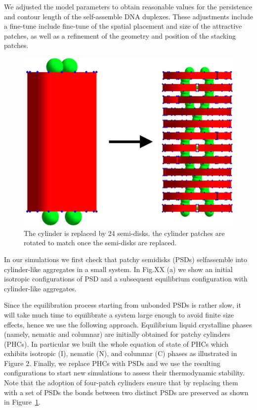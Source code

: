\documentclass[aip,jcp, amsmath, amssymb, reprint]{revtex4-1}
\begin{document}
We adjusted the model parameters to obtain reasonable values for the persistence and contour length of the self-assemble 
DNA duplexes. These adjustments include a fine-tune include fine-tune of the spatial placement and size of 
the attractive patches, as well as a refinement of the geometry and position of the stacking patches. 

\begin{figure}[h!]
\includegraphics[width=0.7\linewidth]{sosti4.png}
\caption{\label{fig:fila} The cylinder is replaced by 24 semi-disks. the cylinder patches are rotated to match once the semi-disks are replaced.}
\end{figure}

In our simulations we first check that patchy semidisks (PSDs) selfassemble into 
cylinder-like aggregates in a small system. In Fig.XX %
(a) we show an initial isotropic configurations of PSD and a subsequent equilibrium 
configuration with cylinder-like aggregates. 

Since the equilibration process starting from unbonded PSDs is rather slow, 
it will take much time to equilibrate a system large enough to avoid finite size
effects, hence we use the following approach.
Equilibrium liquid crystalline phases (namely, nematic and columnar) are 
initially obtained for patchy cylinders (PHCs). 
In particular we built the whole equation of state of PHCs which exhibits
isotropic (I), nematic (N), and columnar (C) phases as illustrated in Figure 2.
Finally, we replace PHCs with PSDs and we use the resulting configurations
to start new simulations to assess their thermodynamic stability. 
Note that the adoption of four-patch cylinders ensure that by replacing
them with a set of PSDs the bonds between two distinct PSDs are preserved as shown in Figure~\ref{fig:fila}.
\end{document}
